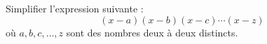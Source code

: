 Simplifier l'expression suivante :
\[
(x - a)(x - b)(x - c) \cdots (x - z)
\]
où $a, b, c, \ldots, z$ sont des nombres deux à deux distincts.
